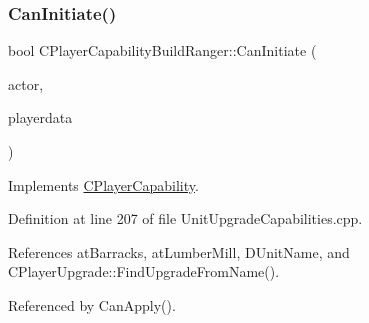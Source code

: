 \subsubsection{\texorpdfstring{Can\+Initiate()}{CanInitiate()}}
{\footnotesize\ttfamily bool C\+Player\+Capability\+Build\+Ranger\+::\+Can\+Initiate (\begin{DoxyParamCaption}\item[{std\+::shared\+\_\+ptr$<$ \hyperlink{classCPlayerAsset}{C\+Player\+Asset} $>$}]{actor,  }\item[{std\+::shared\+\_\+ptr$<$ \hyperlink{classCPlayerData}{C\+Player\+Data} $>$}]{playerdata }\end{DoxyParamCaption})\hspace{0.3cm}{\ttfamily [virtual]}}



Implements \hyperlink{classCPlayerCapability_aa83b1e1fcaff2985c378132d679154ea}{C\+Player\+Capability}.



Definition at line 207 of file Unit\+Upgrade\+Capabilities.\+cpp.



References at\+Barracks, at\+Lumber\+Mill, D\+Unit\+Name, and C\+Player\+Upgrade\+::\+Find\+Upgrade\+From\+Name().



Referenced by Can\+Apply().


